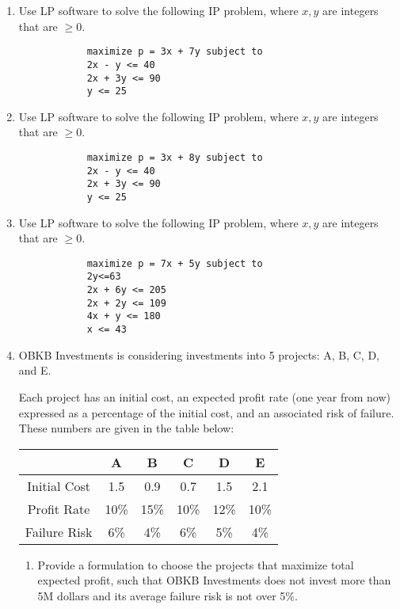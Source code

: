 \documentclass[a4paper,12pt]{article}
\begin{document}
\begin{enumerate}
 		\item Use LP software to solve the following IP problem, where $x,y$ are integers that are $\geq 0$.
 		\begin{framed}
 			\begin{verbatim}
 			maximize p = 3x + 7y subject to
 			2x - y <= 40
 			2x + 3y <= 90
 			y <= 25
 			\end{verbatim}
 		\end{framed}
 		\newpage	
 		\item Use LP software to solve the following IP problem, where $x,y$ are integers that are $\geq 0$.
 		\begin{framed}
 			\begin{verbatim}
 			maximize p = 3x + 8y subject to
 			2x - y <= 40
 			2x + 3y <= 90
 			y <= 25
 			\end{verbatim}
 		\end{framed}
 		
 		
 		\item Use LP software to solve the following IP problem, where $x,y$ are integers that are $\geq 0$.
 		\begin{framed}
 			\begin{verbatim}
 			maximize p = 7x + 5y subject to
 			2y<=63
 			2x + 6y <= 205
 			2x + 2y <= 109
 			4x + y <= 180
 			x <= 43
 			\end{verbatim}
 		\end{framed}
  
  
  
  
  \item OBKB Investments is considering investments into 5 projects: A, B, C, D, and E.
  
  Each project has an initial cost, an expected profit rate (one year from now) expressed as a
  percentage of the initial cost, and an associated risk of failure.
  These numbers are given in the table below:
  
  \begin{center}
  	\begin{tabular}{|c|c|c|c|c|c|}
  		\hline  & A & B & C & D & E \\ 
  		\hline Initial Cost & 1.5 & 0.9 & 0.7 & 1.5 & 2.1 \\ 
  		\hline Profit Rate & 10\% & 15\% & 10\% & 12\% & 10\% \\ 
  		\hline Failure Risk & 6\% & 4\% & 6\% & 5\% & 4\%  \\ 
  		\hline 
  	\end{tabular} 
  \end{center}
  \begin{enumerate}\item  Provide a formulation to choose the projects that maximize total
  	expected profit, such that OBKB Investments does not invest more than
  	5M dollars and its average failure risk is not over 5\%.
  	

\end{enumerate}
\end{enumerate}
\end{document}

